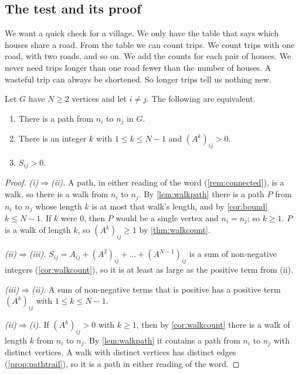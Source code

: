 \subsection{The test and its proof}\label{sec:testproof}

\plainwords We want a quick check for a village.
We only have the table that says which houses share a road.
From the table we can count trips.
We count trips with one road, with two roads, and so on.
We add the counts for each pair of houses.
We never need trips longer than one road fewer than the number of houses.
A wasteful trip can always be shortened.
So longer trips tell us nothing new.

\begin{proposition}\label{prop:pair}
Let $G$ have $N\ge 2$ vertices and let $i\ne j$.
The following are equivalent.
\begin{enumerate}
\item[(i)] There is a path from $n_i$ to $n_j$ in $G$.
\item[(ii)] There is an integer $k$ with $1\le k\le N-1$ and $(A^k)_{ij}>0$.
\item[(iii)] $S_{ij}>0$.
\end{enumerate}
\end{proposition}

\begin{proof}
\emph{(i)$\Rightarrow$(ii).}
A path, in either reading of the word (\cref{rem:connected}), is a walk, so there is a walk from $n_i$ to $n_j$.
By \cref{lem:walkpath} there is a path $P$ from $n_i$ to $n_j$ whose length $k$ is at most that walk's length, and by \cref{cor:bound} $k\le N-1$.
If $k$ were $0$, then $P$ would be a single vertex and $n_i=n_j$; so $k\ge 1$.
$P$ is a walk of length $k$, so $(A^k)_{ij}\ge 1$ by \cref{thm:walkcount}.

\emph{(ii)$\Rightarrow$(iii).}
$S_{ij}=A_{ij}+(A^2)_{ij}+\dots+(A^{N-1})_{ij}$ is a sum of non-negative integers (\cref{cor:walkcount}), so it is at least as large as the positive term from (ii).

\emph{(iii)$\Rightarrow$(ii).}
A sum of non-negative terms that is positive has a positive term $(A^k)_{ij}$ with $1\le k\le N-1$.

\emph{(ii)$\Rightarrow$(i).}
If $(A^k)_{ij}>0$ with $k\ge 1$, then by \cref{cor:walkcount} there is a walk of length $k$ from $n_i$ to $n_j$.
By \cref{lem:walkpath} it contains a path from $n_i$ to $n_j$ with distinct vertices.
A walk with distinct vertices has distinct edges (\cref{prop:pathtrail}), so it is a path in either reading of the word.
\end{proof}

